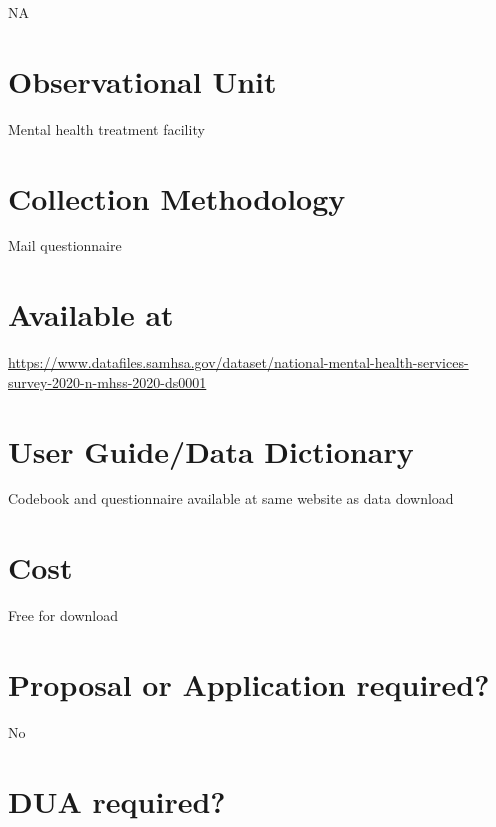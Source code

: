 \documentclass[
]{book}
\begin{document}
NA

\hypertarget{observational-unit-60}{%
\section{Observational Unit}\label{observational-unit-60}}

Mental health treatment facility

\hypertarget{collection-methodology-60}{%
\section{Collection Methodology}\label{collection-methodology-60}}

Mail questionnaire

\hypertarget{available-at-60}{%
\section{Available at}\label{available-at-60}}

\url{https://www.datafiles.samhsa.gov/dataset/national-mental-health-services-survey-2020-n-mhss-2020-ds0001}

\hypertarget{user-guidedata-dictionary-60}{%
\section{User Guide/Data Dictionary}\label{user-guidedata-dictionary-60}}

Codebook and questionnaire available at same website as data download

\hypertarget{cost-60}{%
\section{Cost}\label{cost-60}}

Free for download

\hypertarget{proposal-or-application-required-60}{%
\section{Proposal or Application required?}\label{proposal-or-application-required-60}}

No

\hypertarget{dua-required-60}{%
\section{DUA required?}\label{dua-required-60}}
\end{document}
